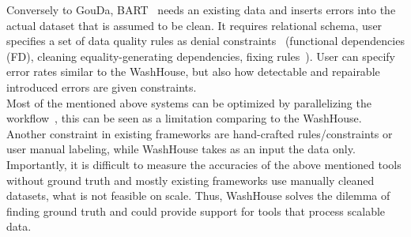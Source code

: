 Conversely to GouDa, BART~\cite{bart} needs an existing data and inserts errors into the actual dataset that is assumed to be clean. It requires relational schema, user specifies
a set of data quality rules as denial constraints~\cite{denialconst} (functional dependencies (FD), cleaning equality-generating dependencies, fixing rules~\cite{fixingrules}). 
User can specify error rates similar to the WashHouse, but also how detectable and repairable introduced errors are given constraints.\\




Most of the mentioned above systems can be optimized by parallelizing the workflow~\cite{raha, baran, holoclean, holodetect, gouda, jenga}, this can be seen as a limitation comparing to the WashHouse.
Another constraint in existing frameworks are hand-crafted rules/constraints or user manual labeling, while WashHouse takes as an input the data only.
Importantly, it is difficult to measure the accuracies of the above mentioned tools without ground truth and mostly existing frameworks use manually cleaned datasets, what is not feasible on scale.
Thus, WashHouse solves the dilemma of finding ground truth and could provide support for tools that process scalable data. 


